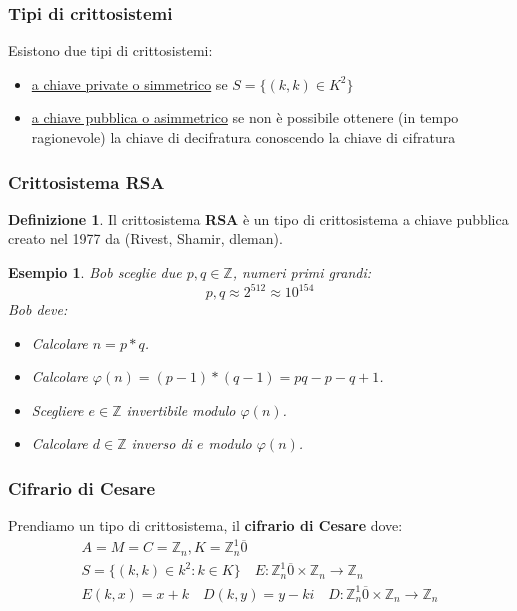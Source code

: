 \documentclass{article}
\newtheorem{exmp}{Esempio}[section]
\theoremstyle{definition}
\newtheorem{definition}{Definizione}[section]
\begin{document}
\subsubsection{Tipi di crittosistemi}
Esistono due tipi di crittosistemi:
\begin{itemize}
        \item \underline{a chiave private o simmetrico} se $S = \{(k,k) \in K^2\}$
        \item \underline{a chiave pubblica o asimmetrico} se non è possibile ottenere (in tempo ragionevole) la chiave di decifratura conoscendo la chiave di cifratura
\end{itemize}

\subsubsection{Crittosistema RSA}
\begin{definition}
        Il crittosistema \textbf{RSA} è un tipo di crittosistema a chiave pubblica creato nel 1977 da (Rivest, Shamir, dleman).
\end{definition}

\begin{exmp}
      Bob sceglie due $p,q \in \mathbb{Z}$, numeri primi grandi:
      \begin{equation*}
              p,q \approx 2^{512} \approx 10^{154}
      \end{equation*}
      Bob deve:
      \begin{itemize}
              \item Calcolare $n = p * q$.
              \item Calcolare $\varphi(n) = (p-1) * (q-1) = pq - p - q + 1$.
              \item Scegliere $e \in \mathbb{Z}$ invertibile modulo $\varphi(n)$.
              \item Calcolare $d \in \mathbb{Z}$ inverso di $e$ modulo $\varphi(n)$.
      \end{itemize}
\end{exmp}


\subsubsection{Cifrario di Cesare}
Prendiamo un tipo di crittosistema, il \textbf{cifrario di Cesare} dove:
\begin{align*}
        A = M = C = \mathbb{Z}_n, K=\mathbb{Z}_n^1{\overline{0}} \\
        S = \{(k,k) \in k^2 : k \in K\} \quad E : \mathbb{Z}_n^1{\overline{0} \times \mathbb{Z}_n \to \mathbb{Z}_n}\\
        E(k,x) = x + k \quad D(k,y) = y - ki \quad D:\mathbb{Z}_n^1{\overline{0}} \times \mathbb{Z}_n \to \mathbb{Z}_n       
\end{align*}
\end{document}
